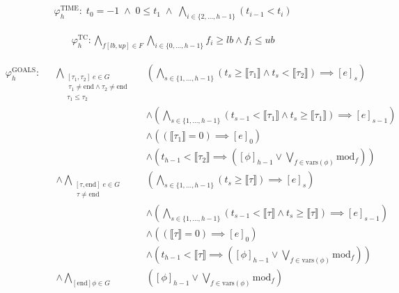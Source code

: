 \documentclass{article}
\begin{document}
\begin{align*}
  &\varphi_{h}^{\text{TIME}}: \; t_0 = -1 \; \land \; 0 \leq t_1 \; \land \; \bigwedge\limits_{i \in \{2, \ldots, h-1\}} \left( t_{i-1} < t_i \right)
\end{align*}

\begin{align*}
  &\varphi_{h}^{\text{TC}}: \bigwedge\limits_{f[lb, up] \in F} \bigwedge\limits_{i \in \{0, \ldots, h-1\}} f_i \geq lb \land f_i \leq ub
\end{align*}

\begin{align*}
  &\varphi_{h}^{\text{GOALS}}: && \bigwedge\limits_{\substack{[\tau_1, \tau_2] \; e \in G\\\ \tau_1 \ne \text{end} \land \tau_2 \ne \text{end} \\ \tau_1 \leq \tau_2 }} &&\left( \bigwedge\limits_{s \in \{1, \ldots, h-1\}} \left(t_s \geq \llbracket \tau_1 \rrbracket \land t_s < \llbracket \tau_2 \rrbracket \right) \implies [e]_{s} \right)\\
  & && && \land \left( \bigwedge\limits_{s \in \{1, \ldots, h-1\}} \left( t_{s-1} < \llbracket \tau_1 \rrbracket \land t_s \geq \llbracket \tau_1 \rrbracket \right) \implies [e]_{s-1} \right)\\
  & && &&  \land \left( \left( \llbracket \tau_1 \rrbracket = 0 \right) \implies [e]_0 \right) \\
  & && && \land \left( t_{h-1}< \llbracket \tau_2 \rrbracket \implies \left( [\phi]_{h-1} \lor \bigvee\limits_{f \in \text{vars}(\phi)} \text{mod}_f \right) \right)\\
  & &&\land \bigwedge\limits_{\substack{[\tau, \text{end}] \; e \in G\\\ \tau \ne \text{end}}} &&\left( \bigwedge\limits_{s \in \{1, \ldots, h-1\}} \left( t_s \geq \llbracket \tau \rrbracket \right) \implies [e]_{s} \right)\\
  & && && \land \left( \bigwedge\limits_{s \in \{1, \ldots, h-1\}} \left( t_{s-1} < \llbracket \tau \rrbracket \land t_s \geq \llbracket \tau \rrbracket \right) \implies [e]_{s-1} \right)\\
  & && && \land \left( \left( \llbracket \tau \rrbracket = 0 \right) \implies [e]_0 \right) \\
  & && && \land \left( t_{h-1} < \llbracket \tau \rrbracket \implies \left( [\phi]_{h-1} \lor \bigvee\limits_{f \in \text{vars}(\phi)} \text{mod}_f \right) \right)
  \\
  & &&\land \bigwedge\limits_{[\text{end}] \phi \in G} &&\left([\phi]_{h-1} \lor \bigvee\limits_{f \in \text{vars}(\phi)} \text{mod}_f \right)\\
\end{align*}
\end{document}
